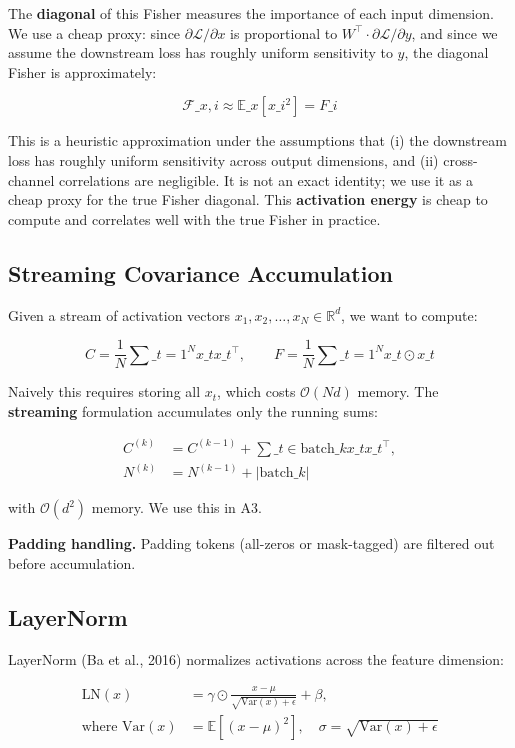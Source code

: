 The \textbf{diagonal} of this Fisher measures the importance of each input 
dimension. We use a cheap proxy: since $\partial \mathcal{L} / \partial x$ is 
proportional to $W^\top \cdot \partial \mathcal{L} / \partial y$, and since 
we assume the downstream loss has roughly uniform sensitivity to $y$, the 
diagonal Fisher is approximately:

\[
\mathcal{F}\_{x, i} \approx \mathbb{E}\_{x}\!\left[x\_i^2\right] = F\_i
\tag{3.6}
\]

This is a heuristic approximation under the assumptions that (i) the downstream loss has roughly uniform sensitivity across output dimensions, and (ii) cross-channel correlations are negligible. It is not an exact identity; we use it as a cheap proxy for the true Fisher diagonal. This \textbf{activation energy} is cheap to compute and correlates well with the true Fisher in practice.

\subsection{Streaming Covariance Accumulation}

Given a stream of activation vectors $x_1, x_2, \dots, x_N \in \mathbb{R}^d$, 
we want to compute:

\[
C = \frac{1}{N} \sum\_{t=1}^N x\_t x\_t^\top, \qquad
F = \frac{1}{N} \sum\_{t=1}^N x\_t \odot x\_t
\tag{3.7}
\]

Naively this requires storing all $x_t$, which costs $\mathcal{O}(Nd)$ memory. 
The \textbf{streaming} formulation accumulates only the running sums:

\begin{align}
C^{(k)} &= C^{(k-1)} + \sum\_{t \in \text{batch}\_k} x\_t x\_t^\top, \tag{3.8a} \\
N^{(k)} &= N^{(k-1)} + |\text{batch}\_k| \tag{3.8b}
\end{align}

with $\mathcal{O}(d^2)$ memory. We use this in A3.

\textbf{Padding handling.} Padding tokens (all-zeros or mask-tagged) are filtered 
out before accumulation.

\subsection{LayerNorm}

LayerNorm (Ba et al., 2016) normalizes activations across the feature 
dimension:

\begin{align}
\text{LN}(x) &= \gamma \odot \frac{x - \mu}{\sqrt{\mathrm{Var}(x) + \epsilon}} + \beta, \tag{3.9a} \\
\text{where } \mathrm{Var}(x) &= \mathbb{E}[(x - \mu)^2], \quad \sigma = \sqrt{\mathrm{Var}(x) + \epsilon} \tag{3.9b}
\end{align}


